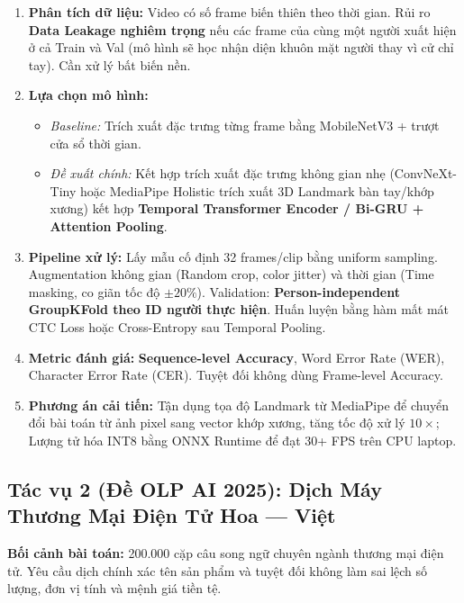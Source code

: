 \documentclass[10pt,a4paper]{article}
\begin{document}
\begin{enumerate}[leftmargin=*]
    \item \textbf{Phân tích dữ liệu:} Video có số frame biến thiên theo thời gian. Rủi ro \textbf{Data Leakage nghiêm trọng} nếu các frame của cùng một người xuất hiện ở cả Train và Val (mô hình sẽ học nhận diện khuôn mặt người thay vì cử chỉ tay). Cần xử lý bất biến nền.
    \item \textbf{Lựa chọn mô hình:}
    \begin{itemize}
        \item \textit{Baseline:} Trích xuất đặc trưng từng frame bằng MobileNetV3 + trượt cửa sổ thời gian.
        \item \textit{Đề xuất chính:} Kết hợp trích xuất đặc trưng không gian nhẹ (ConvNeXt-Tiny hoặc MediaPipe Holistic trích xuất 3D Landmark bàn tay/khớp xương) kết hợp \textbf{Temporal Transformer Encoder / Bi-GRU + Attention Pooling}.
    \end{itemize}
    \item \textbf{Pipeline xử lý:} Lấy mẫu cố định 32 frames/clip bằng uniform sampling. Augmentation không gian (Random crop, color jitter) và thời gian (Time masking, co giãn tốc độ $\pm 20\%$). Validation: \textbf{Person-independent GroupKFold theo ID người thực hiện}. Huấn luyện bằng hàm mất mát CTC Loss hoặc Cross-Entropy sau Temporal Pooling.
    \item \textbf{Metric đánh giá:} \textbf{Sequence-level Accuracy}, Word Error Rate (WER), Character Error Rate (CER). Tuyệt đối không dùng Frame-level Accuracy.
    \item \textbf{Phương án cải tiến:} Tận dụng tọa độ Landmark từ MediaPipe để chuyển đổi bài toán từ ảnh pixel sang vector khớp xương, tăng tốc độ xử lý $10\times$; Lượng tử hóa INT8 bằng ONNX Runtime để đạt 30+ FPS trên CPU laptop.
\end{enumerate}

\subsection{Tác vụ 2 (Đề OLP AI 2025): Dịch Máy Thương Mại Điện Tử Hoa --- Việt}
\textbf{Bối cảnh bài toán:} 200.000 cặp câu song ngữ chuyên ngành thương mại điện tử. Yêu cầu dịch chính xác tên sản phẩm và tuyệt đối không làm sai lệch số lượng, đơn vị tính và mệnh giá tiền tệ.
\end{document}
